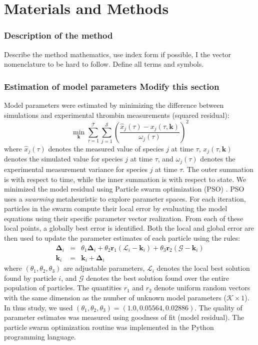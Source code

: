 \documentclass[10pt,twocolumn,twoside,final]{IEEEtran}
\begin{document}
\section{Materials and Methods}

\noindent\subsubsection*{Description of the method}
Describe the method mathematics, use index form if possible, I the vector nomenclature to be hard to follow. Define all terms and symbols.

\subsubsection*{Estimation of model parameters Modify this section}
Model parameters were estimated by minimizing the difference between simulations and experimental thrombin measurements (squared residual):
\begin{equation}\label{eqn:objective-function}
	\min_{\mathbf{k}} \sum_{\tau=1}^{\mathcal{T}}\sum_{j=1}^{\mathcal{S}}\left(\frac{\hat{x}_{j}\left(\tau\right) - x_{j}\left(\tau,\mathbf{k}\right)}{\omega_{j}\left(\tau\right)}\right)^{2}
\end{equation}where $\hat{x}_{j}\left(\tau\right)$ denotes the measured value of species $j$ at time $\tau$, $x_{j}\left(\tau,\mathbf{k}\right)$ denotes the simulated
value for species $j$ at time $\tau$, and $\omega_{j}\left(\tau\right)$ denotes the experimental measurement variance for species $j$ at time $\tau$.
The outer summation is with respect to time, while the inner summation is with respect to state. We minimized the model residual using Particle swarm optimization (PSO) \cite{PSO}. PSO uses a \textit{swarming} metaheuristic to explore parameter spaces.
For each iteration, particles in the swarm compute their local error by evaluating the model equations using their specific parameter vector realization.
From each of these local points, a globally best error is identified. Both the local and global error
are then used to update the parameter estimates of each particle using the rules:
\begin{eqnarray}
	\mathbf{\Delta}_{i} &=&\theta_{1}\mathbf{\Delta}_{i} + \theta_{2}\mathbf{r}_{1}\left(\mathcal{L}_{i} - \mathbf{k}_{i}\right) + \theta_{3}\mathbf{r}_{2}\left(\mathcal{G} - \mathbf{k}_{i}\right) \\
	\mathbf{k}_{i} &=& \mathbf{k}_{i} + \mathbf{\Delta}_{i}
\end{eqnarray}where $\left(\theta_{1},\theta_{2},\theta_{3}\right)$ are adjustable parameters, $\mathcal{L}_{i}$ denotes the local best solution found by particle $i$, and
$\mathcal{G}$ denotes the best solution found over the entire population of particles. The quantities $r_{1}$ and $r_{2}$ denote uniform random vectors with the same dimension as the number of unknown model
parameters ($\mathcal{K}\times{1}$). In thus study, we used $\left(\theta_{1},\theta_{2},\theta_{3}\right) = \left(1.0, 0.05564, 0.02886\right)$. The quality of parameter
estimates was measured using goodness of fit (model residual). The particle swarm optimization routine was implemented in the Python programming language.


\end{document}
